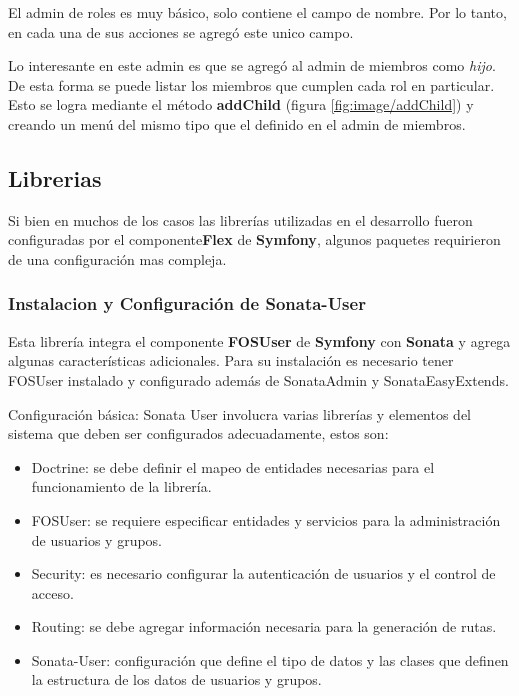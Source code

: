 \documentclass{article}
\begin{document}
El admin de roles es muy básico, solo contiene el campo de nombre. Por lo tanto, en cada una de sus acciones se agregó este unico campo.


Lo interesante en este admin es que se agregó al admin de miembros como \textit{hijo}. De esta forma se puede listar los miembros que cumplen cada rol en
particular.
Esto se logra mediante el método \textbf{addChild} (figura \ref{fig:image/addChild}) y creando un menú del mismo tipo que el definido en el admin de miembros.

\newpage
\subsection{Librerias}%
\label{sub:librerias}

Si bien en muchos de los casos las librerías utilizadas en el desarrollo fueron configuradas por el componente\textbf{Flex}  de \textbf{Symfony}, algunos paquetes
requirieron de una configuración mas compleja.

\subsubsection{Instalacion y Configuración de \textbf{Sonata-User}}%
\label{ssub:instalacion_y_configuración_de_sonata-user}

Esta librería integra el componente \textbf{FOSUser} de \textbf{Symfony} con \textbf{Sonata} y agrega algunas características adicionales.
Para su instalación es necesario tener FOSUser instalado y configurado además de SonataAdmin y SonataEasyExtends.


Configuración básica: Sonata User involucra varias librerías y elementos del sistema que deben ser configurados adecuadamente, estos son:

\begin{itemize}
    \item Doctrine: se debe definir el mapeo de entidades necesarias para el funcionamiento de la librería.
    \item FOSUser: se requiere especificar entidades y servicios para la administración de usuarios y grupos.
    \item Security: es necesario configurar la autenticación de usuarios y el control de acceso.
    \item Routing: se debe agregar información necesaria para la generación de rutas.
    \item Sonata-User: configuración que define el tipo de datos y las clases que definen la estructura de los datos de usuarios y grupos.
\end{itemize}





\newpage
\printbibliography
\end{document}
